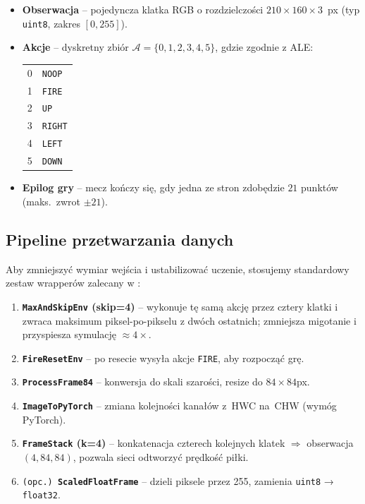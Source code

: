 \documentclass[12pt,a4paper]{article}
\begin{document}
\begin{itemize}
  \item \textbf{Obserwacja} – pojedyncza klatka RGB
        o rozdzielczości \(210\times160\times3\)~px  
        (typ \texttt{uint8}, zakres \([0,255]\)).
  \item \textbf{Akcje} – dyskretny zbiór  
        \(\mathcal{A}=\{0,1,2,3,4,5\}\), gdzie zgodnie z ALE:
        \begin{center}
          \begin{tabular}{cl}
            0 & \texttt{NOOP} \\ 1 & \texttt{FIRE} \\
            2 & \texttt{UP}   \\ 3 & \texttt{RIGHT} \\
            4 & \texttt{LEFT} \\ 5 & \texttt{DOWN}
          \end{tabular}
        \end{center}
  \item \textbf{Epilog gry} – mecz kończy się, gdy jedna ze stron
        zdobędzie \(21\) punktów (maks.\ zwrot $\pm21$).
\end{itemize}

\subsection{Pipeline przetwarzania danych}

Aby zmniejszyć wymiar wejścia i ustabilizować uczenie, stosujemy
standardowy zestaw wrapperów zalecany w \cite{Mnih2016A3C,Lapan2018}:

\begin{enumerate}
  \item \textbf{\texttt{MaxAndSkipEnv} (skip=4)}  
        – wykonuje tę samą akcję przez cztery klatki i zwraca maksimum
        piksel-po-pikselu z dwóch ostatnich; zmniejsza migotanie i 
        przyspiesza symulację \(\approx 4\times\).
  \item \textbf{\texttt{FireResetEnv}}  
        – po resecie wysyła akcje \texttt{FIRE}, aby rozpocząć grę.
  \item \textbf{\texttt{ProcessFrame84}}  
        – konwersja do skali szarości, resize do \(84\times84\)px.
  \item \textbf{\texttt{ImageToPyTorch}}  
        – zmiana kolejności kanałów z~HWC na~CHW (wymóg PyTorch).
  \item \textbf{\texttt{FrameStack} (k=4)}  
        – konkatenacja czterech kolejnych klatek
        \(\Rightarrow\) obserwacja \((4,84,84)\), pozwala
        sieci odtworzyć prędkość piłki.
  \item \texttt{(opc.) \textbf{ScaledFloatFrame}}  
        – dzieli piksele przez 255, zamienia \texttt{uint8} → \texttt{float32}.
\end{enumerate}
\end{document}
